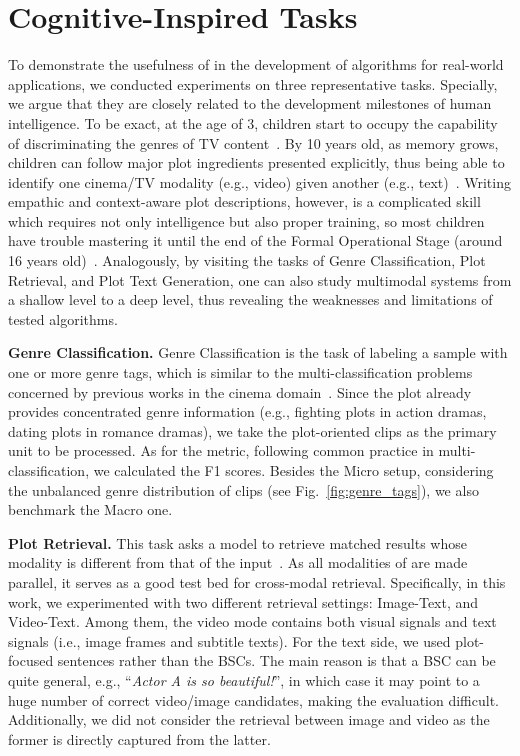 \section{Cognitive-Inspired Tasks}
\label{sec:tasks}

To demonstrate the usefulness of \TVD in the development of algorithms for real-world applications, we conducted experiments on three representative tasks. Specially, we argue that they are closely related to the development milestones of human intelligence. To be exact, at the age of 3, children start to occupy the capability of discriminating the genres of TV content~\citep{wright1994young}. By 10 years old, as memory grows, children can follow major plot ingredients presented explicitly, thus being able to identify one cinema/TV modality (e.g., video) given another (e.g., text)~\citep{gunter2005children}. Writing empathic and context-aware plot descriptions, however, is a complicated skill which requires not only intelligence but also proper training, so most children have trouble mastering it until the end of the Formal Operational Stage (around 16 years old)~\citep{piaget2003psychology}. Analogously, by visiting the tasks of Genre Classification, Plot Retrieval, and Plot Text Generation, one can also study multimodal systems from a shallow level to a deep level, thus revealing the weaknesses and limitations of tested algorithms.

\noindent\textbf{Genre Classification.} Genre Classification is the task of labeling a sample with one or more genre tags, which is similar to the multi-classification problems concerned by previous works in the cinema domain~\citep{moviescope2019arxiv,movienet2020eccv}.
Since the plot already provides concentrated genre information (e.g., fighting plots in action dramas, dating plots in romance dramas), we take the plot-oriented clips as the primary unit to be processed.
As for the metric, following common practice in multi-classification, we calculated the F1 scores. Besides the Micro setup, considering the unbalanced genre distribution of clips (see Fig.~\ref{fig:genre_tags}), we also benchmark the Macro one.


\noindent\textbf{Plot Retrieval.} This task asks a model to retrieve matched results whose modality is different from that of the input~\citep{cmr2016arxiv}.
As all modalities of \TVD are made parallel, it serves as a good test bed for cross-modal retrieval.
Specifically, in this work, we experimented with two different retrieval settings: Image-Text, and Video-Text. Among them, the video mode contains both visual signals and text signals (i.e., image frames and subtitle texts).
For the text side, we used plot-focused sentences rather than the BSCs. The main reason is that a BSC can be quite general, e.g., ``\textit{Actor A is so beautiful!}'', in which case it may point to a huge number of correct video/image candidates, making the evaluation difficult. 
Additionally, we did not consider the retrieval between image and video as the former is directly captured from the latter.

